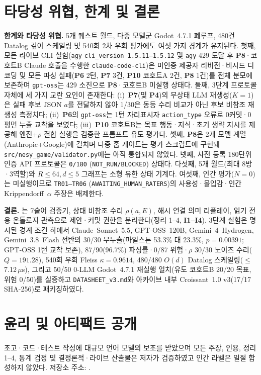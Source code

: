 \FloatBarrier
\section{타당성 위협, 한계 및 결론}\label{sec:conclusion}
\textbf{한계와 타당성 위협.} 5개 퀘스트 월드, 다중 모델군 Godot~4.7.1 폐루프, 480건 Datalog 깊이 스케일링 및 540회 2차 우회 평가에도 여섯 가지 경계가 유지된다. 첫째, 모든 라이브 CLI 실험(\texttt{agy} \texttt{cli\_version~1.5.11--1.5.12} 및 \texttt{agy} 429 도달 후 \textbf{P8}·코호트B Claude 호출을 수행한 \texttt{claude-code-cli})은 미인증 제공자 리비전·비시드 디코딩 및 모든 파싱 실패(\textbf{P6} 2턴, \textbf{P7} 3건, \textbf{P10} 코호트A 2건, \textbf{P8} 1건)를 전체 분모에 보존하며 \texttt{gpt-oss}는 429 소진으로 \textbf{P8}·코호트B 미실행 상태다. 둘째, 3단계 프로토콜 자체에 세 가지 교란 요인이 존재한다: (i)~\textbf{P7}(및 \textbf{P4})의 무상태 LLM 재생성($K{=}1$)은 실패 후보 JSON $a$를 전달하지 않아 1/30은 동등 수리 비교가 아닌 후보 비참조 재생성 측정치다; (ii)~\textbf{P6}의 \texttt{gpt-oss}는 1턴 자리표시자 \texttt{action\_type} 오류로 0커밋·0평면 누출 교착을 보였다; (iii)~\textbf{P10} 코호트B는 목표 행동·지식·초기 생략 지시를 제공해 엔진+$\rho$ 결합 실행을 검증한 프롬프트 유도 평가다. 셋째, \textbf{P8}은 2개 모델 계열(Anthropic+Google)에 걸치며 다중 홉 게이트는 평가 스크립트에 구현돼 \texttt{src/nesy\_game/validator.py}에는 아직 통합되지 않았다. 넷째, 사전 등록 180단위 인증 API 프로토콜은 \texttt{0/180} (\texttt{NOT\_RUN/BLOCKED}) 상태다. 다섯째, 5개 월드(최대 8방·3역할)와 $R{\le}64, d{\le}5$ 그래프는 소형 유한 상태 기계다. 여섯째, 인간 평가($N{=}0$)는 미실행이므로 \texttt{TR01--TR06} (\texttt{AWAITING\_}\allowbreak\texttt{HUMAN\_}\allowbreak\texttt{RATERS})의 사용성·몰입감·인간 Krippendorff~$\alpha$ 주장은 배제한다.

\textbf{결론.} \system{}는 7술어 검증기, 상태 비참조 수리 $\rho(a,E)$, 해시 연결 의미 리플레이, 읽기 전용 온톨로지 관측으로 제안·커밋 권한을 분리한다(정리 1--4, \textbf{I1--I4}). 3단계 실험은 명시된 경계 조건 하에서 Claude~Sonnet~5.5, GPT-OSS~120B, Gemini~4~Hydrogen, Gemini~3.8~Flash 전반의 30/30 무누출(마일스톤 53.3\% 대 23.3\%, $p{=}0.00391$; GPT-OSS 1턴 교착 보존), 87/90(96.7\%) 파싱률·0/87 위험·$\rho$ 30/30 노이즈 수리($Q{=}191.28$), 540회 우회 Fleiss $\kappa{=}0.9614$, 480/480 $O(d)$ Datalog 스케일링($\le$7.12\,$\mu$s), 그리고 50/50 0-LLM Godot~4.7.1 재실행 일치(유도 코호트B 20/20 목표, 위험 0/50)를 실증하고 \texttt{DATASHEET\_v3.md}와 아카이브 내부 Croissant~1.0 v3(17/17 SHA-256)로 패키징하였다.

\section*{윤리 및 아티팩트 공개}
초고·코드·테스트 작성에 대규모 언어 모델의 보조를 받았으며 모든 주장, 인용, 정리 1--4, 통계 검정 및 결정론적·라이브 산출물은 저자가 검증하였고 인간 라벨은 일절 합성하지 않았다. 저장소 주소: \RepoURL.

